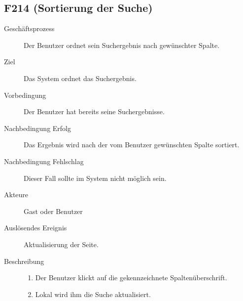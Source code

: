 \subsection{F214 (Sortierung der Suche)}
\label{F:sort}
\begin{description}
  \item[Geschäftsprozess]Der Benutzer ordnet sein Suchergebnis nach gewünschter Spalte.
  \item[Ziel]Das System ordnet das Suchergebnis.
  \item[Vorbedingung]Der Benutzer hat bereits seine Suchergebnisse.
  \item[Nachbedingung Erfolg]Das Ergebnis wird nach der vom Benutzer gewünschten Spalte sortiert.
  \item[Nachbedingung Fehlschlag]Dieser Fall sollte im System nicht möglich sein.
  \item[Akteure]Gast oder Benutzer
  \item[Auslösendes Ereignis]Aktualisierung der Seite.
  \item[Beschreibung]\hfill
    \begin{enumerate}
      \item Der Benutzer klickt auf die gekennzeichnete Spaltenüberschrift.
      \item Lokal wird ihm die Suche aktualisiert.
    \end{enumerate}
\end{description}

